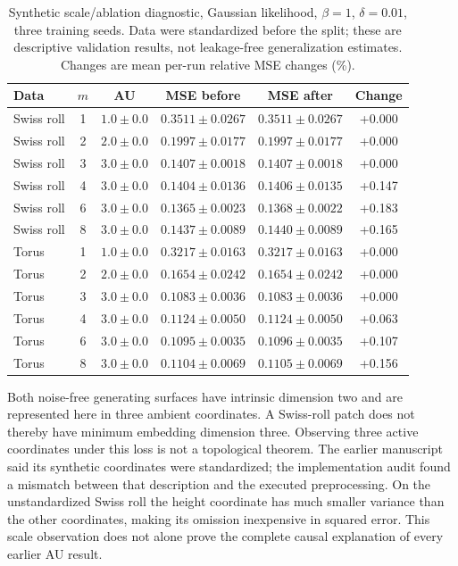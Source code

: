 \documentclass[make,article,submit,pdftex,moreauthors]{Definitions/mdpi}
\begin{document}
\begin{table}[H]
\caption{Synthetic scale/ablation diagnostic, Gaussian likelihood, $\beta=1$, $\delta=0.01$, three training seeds. Data were standardized before the split; these are descriptive validation results, not leakage-free generalization estimates. Changes are mean per-run relative MSE changes (\%).}\label{tab:synthetic}
\footnotesize
\setlength{\tabcolsep}{3.5pt}
\begin{tabular*}{\textwidth}{@{\extracolsep{\fill}}lccccc@{}}
\toprule
Data & $m$ & AU & MSE before & MSE after & Change \\
\midrule
Swiss roll & 1 & $1.0 \pm 0.0$ & $0.3511 \pm 0.0267$ & $0.3511 \pm 0.0267$ & +0.000 \\
Swiss roll & 2 & $2.0 \pm 0.0$ & $0.1997 \pm 0.0177$ & $0.1997 \pm 0.0177$ & +0.000 \\
Swiss roll & 3 & $3.0 \pm 0.0$ & $0.1407 \pm 0.0018$ & $0.1407 \pm 0.0018$ & +0.000 \\
Swiss roll & 4 & $3.0 \pm 0.0$ & $0.1404 \pm 0.0136$ & $0.1406 \pm 0.0135$ & +0.147 \\
Swiss roll & 6 & $3.0 \pm 0.0$ & $0.1365 \pm 0.0023$ & $0.1368 \pm 0.0022$ & +0.183 \\
Swiss roll & 8 & $3.0 \pm 0.0$ & $0.1437 \pm 0.0089$ & $0.1440 \pm 0.0089$ & +0.165 \\
Torus & 1 & $1.0 \pm 0.0$ & $0.3217 \pm 0.0163$ & $0.3217 \pm 0.0163$ & +0.000 \\
Torus & 2 & $2.0 \pm 0.0$ & $0.1654 \pm 0.0242$ & $0.1654 \pm 0.0242$ & +0.000 \\
Torus & 3 & $3.0 \pm 0.0$ & $0.1083 \pm 0.0036$ & $0.1083 \pm 0.0036$ & +0.000 \\
Torus & 4 & $3.0 \pm 0.0$ & $0.1124 \pm 0.0050$ & $0.1124 \pm 0.0050$ & +0.063 \\
Torus & 6 & $3.0 \pm 0.0$ & $0.1095 \pm 0.0035$ & $0.1096 \pm 0.0035$ & +0.107 \\
Torus & 8 & $3.0 \pm 0.0$ & $0.1104 \pm 0.0069$ & $0.1105 \pm 0.0069$ & +0.156 \\
\bottomrule
\end{tabular*}
\end{table}


Both noise-free generating surfaces have intrinsic dimension two and
are represented here in three ambient coordinates. A Swiss-roll patch
does not thereby have minimum embedding dimension three. Observing
three active coordinates under this loss is not a topological theorem.
The earlier manuscript said its synthetic coordinates were standardized;
the implementation audit found a mismatch between that description and
the executed preprocessing. On the unstandardized Swiss roll the height
coordinate has much smaller variance than the other coordinates, making
its omission inexpensive in squared error. This scale observation does
not alone prove the complete causal explanation of every earlier AU
result.
\end{document}
